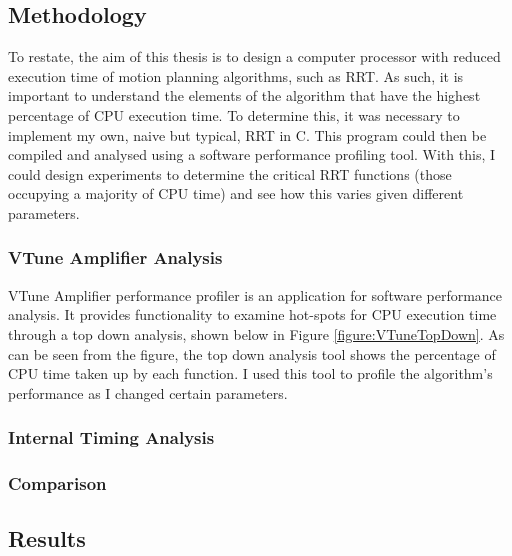 


\subsection{Methodology}
    To restate, the aim of this thesis is to design a computer processor with reduced execution time of motion planning algorithms, such as \ac{RRT}. As such, it is important to understand the elements of the algorithm that have the highest percentage of CPU execution time. To determine this, it was necessary to implement my own, naive but typical, \ac{RRT} in C. This program could then be compiled and analysed using a software performance profiling tool. With this, I could design experiments to determine the critical RRT functions (those occupying a majority of CPU time) and see how this varies given different parameters.

    \subsubsection{VTune Amplifier Analysis}
    \label{subsubsection:vtune}
        VTune Amplifier performance profiler is an application for software performance analysis. It provides functionality to examine hot-spots for CPU execution time through a top down analysis, shown below in Figure \ref{figure:VTuneTopDown}. As can be seen from the figure, the top down analysis tool shows the percentage of CPU time taken up by each function. I used this tool to profile the algorithm's performance as I changed certain parameters.
        

    \subsubsection{Internal Timing Analysis}

    \subsubsection{Comparison}

\subsection{Results}